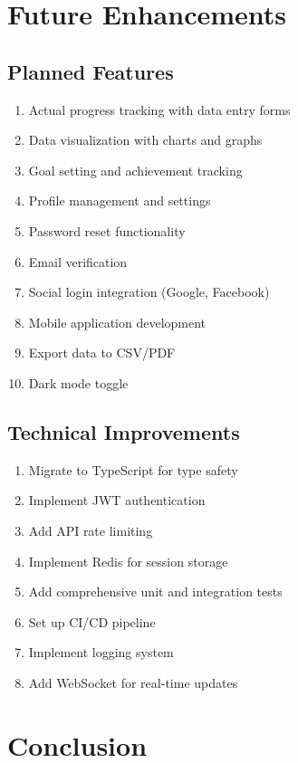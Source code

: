 \documentclass[12pt,a4paper]{article}
\begin{document}
\section{Future Enhancements}

\subsection{Planned Features}
\begin{enumerate}
    \item Actual progress tracking with data entry forms
    \item Data visualization with charts and graphs
    \item Goal setting and achievement tracking
    \item Profile management and settings
    \item Password reset functionality
    \item Email verification
    \item Social login integration (Google, Facebook)
    \item Mobile application development
    \item Export data to CSV/PDF
    \item Dark mode toggle
\end{enumerate}

\subsection{Technical Improvements}
\begin{enumerate}
    \item Migrate to TypeScript for type safety
    \item Implement JWT authentication
    \item Add API rate limiting
    \item Implement Redis for session storage
    \item Add comprehensive unit and integration tests
    \item Set up CI/CD pipeline
    \item Implement logging system
    \item Add WebSocket for real-time updates
\end{enumerate}

\section{Conclusion}
\end{document}
